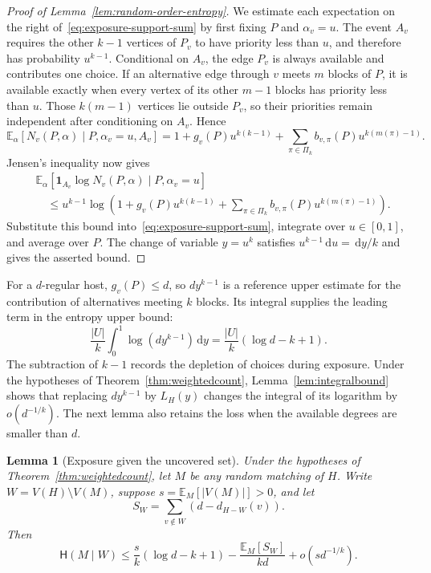 \documentclass[11pt,reqno]{amsart}
\numberwithin{equation}{section}
\theoremstyle{plain}
\newtheorem{lemma}[theorem]{Lemma}
\theoremstyle{definition}
\newcommand{\E}{\mathbb E}
\newcommand{\HH}{\mathsf H}
\newcommand{\dd}{\,\mathrm d}
\begin{document}
\begin{proof}[Proof of Lemma~\ref{lem:random-order-entropy}]
    We estimate each expectation on the right of~\eqref{eq:exposure-support-sum} by first fixing $P$ and $\alpha_v=u$.
    The event $A_v$ requires the other $k-1$ vertices of $P_v$ to have priority less than $u$, and therefore has probability $u^{k-1}$.
    Conditional on $A_v$, the edge $P_v$ is always available and contributes one choice.
    If an alternative edge through $v$ meets $m$ blocks of $P$, it is available exactly when every vertex of its other $m-1$ blocks has priority less than $u$.
    Those $k(m-1)$ vertices lie outside $P_v$, so their priorities remain independent after conditioning on $A_v$.
    Hence
    \[
        \E_\alpha[N_v(P,\alpha)\mid P,\alpha_v=u,A_v]
        =1+g_v(P)u^{k(k-1)}
        +\sum_{\pi\in\Pi_k}b_{v,\pi}(P)u^{k(m(\pi)-1)}.
    \]
    Jensen's inequality now gives
    \[
        \begin{aligned}
            &\E_\alpha[\mathbf1_{A_v}\log N_v(P,\alpha)\mid P,\alpha_v=u]\\
            &\quad\le u^{k-1}\log\left(1+g_v(P)u^{k(k-1)}
            +\sum_{\pi\in\Pi_k}b_{v,\pi}(P)u^{k(m(\pi)-1)}\right).
        \end{aligned}
    \]
    Substitute this bound into~\eqref{eq:exposure-support-sum}, integrate over $u\in[0,1]$, and average over $P$.
    The change of variable $y=u^k$ satisfies $u^{k-1}\dd u=\dd y/k$ and gives the asserted bound.
\end{proof}

For a $d$-regular host, $g_v(P)\le d$, so $dy^{k-1}$ is a reference upper estimate for the contribution of alternatives meeting $k$ blocks.
Its integral supplies the leading term in the entropy upper bound:
\[
    \frac{|U|}{k}\int_0^1\log(dy^{k-1})\dd y
    =\frac{|U|}{k}(\log d-k+1).
\]
The subtraction of $k-1$ records the depletion of choices during exposure.
Under the hypotheses of Theorem~\ref{thm:weightedcount}, Lemma~\ref{lem:integralbound} shows that replacing $dy^{k-1}$ by $L_H(y)$ changes the integral of its logarithm by $o(d^{-1/k})$.
The next lemma also retains the loss when the available degrees are smaller than $d$.

\begin{lemma}[Exposure given the uncovered set]\label{lem:exposure}
    Under the hypotheses of Theorem~\ref{thm:weightedcount}, let $M$ be any random matching of $H$.
    Write $W=V(H)\setminus V(M)$, suppose $s=\E_M[|V(M)|]>0$, and let
    \[
        S_W=\sum_{v\notin W}(d-d_{H-W}(v)).
    \]
    Then
    \[
        \HH(M\mid W)\le\frac sk(\log d-k+1)-\frac{\E_M[S_W]}{kd}+o(sd^{-1/k}).
    \]
\end{lemma}
\end{document}
